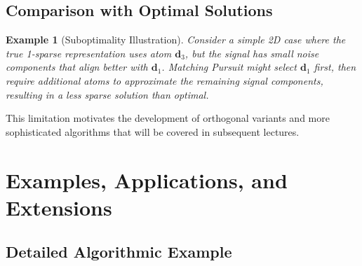 \documentclass[12pt]{article}
\newtheorem{example}[theorem]{Example}
\begin{document}
\subsection{Comparison with Optimal Solutions}

\begin{example}[Suboptimality Illustration]\label{ex:suboptimality}
    Consider a simple 2D case where the true 1-sparse representation uses atom $\mathbf{d}_3$, but the signal has small noise components that align better with $\mathbf{d}_1$. Matching Pursuit might select $\mathbf{d}_1$ first, then require additional atoms to approximate the remaining signal components, resulting in a less sparse solution than optimal.
\end{example}

This limitation motivates the development of orthogonal variants and more sophisticated algorithms that will be covered in subsequent lectures.

\newpage

\section{Examples, Applications, and Extensions}

\subsection{Detailed Algorithmic Example}
\end{document}

